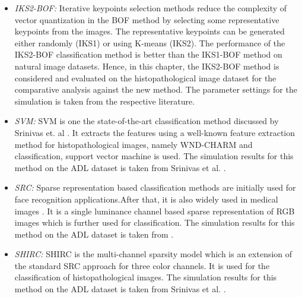 \begin{itemize}
\item \emph{IKS2-BOF:} Iterative keypoints selection methods \cite{lin2016} reduce the complexity of vector quantization in the BOF method by selecting some representative keypoints from the images. The representative keypoints can be generated either randomly (IKS1) or using K-means (IKS2). The performance of the IKS2-BOF classification method is better than the IKS1-BOF method on natural image datasets. Hence, in this chapter, the IKS2-BOF method is considered and evaluated on the histopathological image dataset for the comparative analysis against the new method.  The parameter settings for the simulation is taken from the respective literature. 

\item \emph{SVM:} SVM is one the state-of-the-art classification method discussed by Srinivas et. al \cite{srinivas2014}. It extracts the features using a well-known feature extraction method for histopathological images, namely WND-CHARM \cite{orlov2008} and classification, support vector machine is used.  The simulation results for this method on the ADL dataset is taken from Srinivas et al. \cite{srinivas2014}.

\item \emph{SRC:} Sparse representation  based classification methods are initially used for face recognition applications\cite{Wagner2012}.After that, it is also widely used in medical images \cite{srinivas2014}. It is a single luminance channel based sparse representation of RGB images which is further used for classification. The simulation results for this method on the ADL dataset is taken from \cite{srinivas2014}.

\item \emph{SHIRC:} SHIRC is the multi-channel sparsity model which is an extension of the standard SRC approach for three color channels. It is used for the classification of histopathological images. The simulation results for this method on the ADL dataset is taken from Srinivas et al. \cite{srinivas2014}.
\end{itemize}

